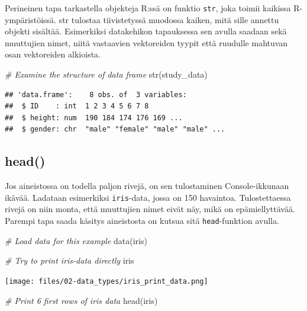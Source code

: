 \documentclass[
]{book}
\newenvironment{Shaded}{\begin{snugshade}}{\end{snugshade}}
\newcommand{\CommentTok}[1]{\textcolor[rgb]{0.56,0.35,0.01}{\textit{#1}}}
\newcommand{\FunctionTok}[1]{\textcolor[rgb]{0.00,0.00,0.00}{#1}}
\newcommand{\NormalTok}[1]{#1}
\begin{document}
Perineinen tapa tarkastella objekteja R:ssä on funktio \texttt{str}, joka toimii kaikissa R-ympäristöissä. str tulostaa tiivistetyssä muodossa kaiken, mitä sille annettu objekti sisältää. Esimerkiksi datakehikon tapauksessa sen avulla saadaan sekä muuttujien nimet, niitä vastaavien vektoreiden tyypit että ruudulle mahtuvan osan vektoreiden alkioista.

\begin{Shaded}
\begin{Highlighting}[]
\CommentTok{\# Examine the structure of data frame}
\FunctionTok{str}\NormalTok{(study\_data)}
\end{Highlighting}
\end{Shaded}

\begin{verbatim}
## 'data.frame':    8 obs. of  3 variables:
##  $ ID    : int  1 2 3 4 5 6 7 8
##  $ height: num  190 184 174 176 169 ...
##  $ gender: chr  "male" "female" "male" "male" ...
\end{verbatim}

\hypertarget{head}{%
\subsection{head()}\label{head}}

Jos aineistossa on todella paljon rivejä, on sen tulostaminen Console-ikkunaan ikävää. Ladataan esimerkiksi \texttt{iris}-data, jossa on 150 havaintoa. Tulostettaessa rivejä on niin monta, että muuttujien nimet eivät näy, mikä on epämiellyttävää. Parempi tapa saada käsitys aineistosta on kutsua sitä \texttt{head}-funktion avulla.

\begin{Shaded}
\begin{Highlighting}[]
\CommentTok{\# Load data for this example}
\FunctionTok{data}\NormalTok{(iris)}

\CommentTok{\# Try to print iris{-}data directly}
\NormalTok{iris}
\end{Highlighting}
\end{Shaded}

\texttt{[image: files/02-data\_types/iris\_print\_data.png]}

\begin{Shaded}
\begin{Highlighting}[]
\CommentTok{\# Print 6 first rows of iris data}
\FunctionTok{head}\NormalTok{(iris)}
\end{Highlighting}
\end{Shaded}
\end{document}
